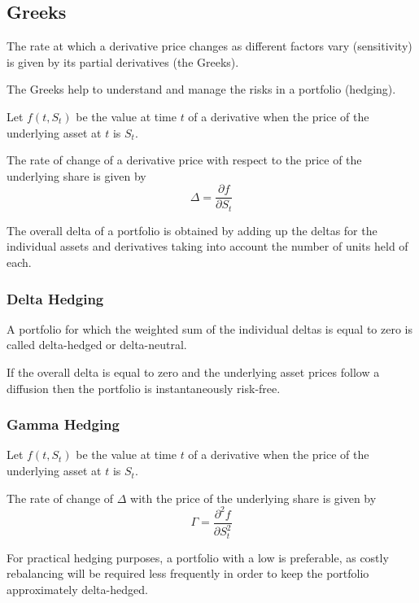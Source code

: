 \documentclass[11pt,a4paper]{book}
\theoremstyle{definition}\newtheorem{definition}{Definition}
\theoremstyle{definition}\newtheorem{fact}{Fact}
\theoremstyle{definition}\newtheorem{remark}{Remark}
\theoremstyle{definition}\newtheorem{ex}{Ex.}
\theoremstyle{definition}\newtheorem{project}{Project}
\theoremstyle{definition}\newtheorem{problem}{Problem}
\theoremstyle{definition}\newtheorem{example}{Example}
\numberwithin{theorem}{section}
\numberwithin{corollary}{chapter}
\numberwithin{assumption}{chapter}
\numberwithin{definition}{chapter}
\numberwithin{prop}{chapter}
\numberwithin{notation}{chapter}
\numberwithin{problem}{chapter}
\numberwithin{example}{chapter}
\numberwithin{fact}{chapter}
\numberwithin{ex}{chapter}
\begin{document}
\subsection{Greeks}

The rate at which a derivative price changes as different factors vary (sensitivity) is given by its partial derivatives (the Greeks).

The Greeks help to understand and manage the risks in a portfolio (hedging).

Let $f(t, S_t)$ be the value at time $t$ of a derivative when the price of the underlying asset at $t$ is $S_t$.

The rate of change of a derivative price with respect to the price of the underlying share is given by
\begin{equation}
\Delta = \frac{\partial f}{\partial S_t}
\end{equation}

The overall delta of a portfolio is obtained by adding up the deltas for the individual assets and derivatives taking into account the number of units held of each.

\subsubsection*{Delta Hedging}

A portfolio for which the weighted sum of the individual deltas is equal to zero is called delta-hedged or delta-neutral.

If the overall delta is equal to zero and the underlying asset prices follow a diffusion then the portfolio is instantaneously risk-free.

\subsubsection*{Gamma Hedging}

Let $f(t, S_t)$ be the value at time $t$ of a derivative when the price of the underlying asset at $t$ is $S_t$.

The rate of change of $\Delta$ with the price of the underlying share is given by
\begin{equation}
\Gamma = \frac{\partial^2 f}{\partial S_t^2}
\end{equation}

For practical hedging purposes, a portfolio with a low is preferable, as costly rebalancing will be required less frequently in order to keep the portfolio approximately delta-hedged.
\end{document}
